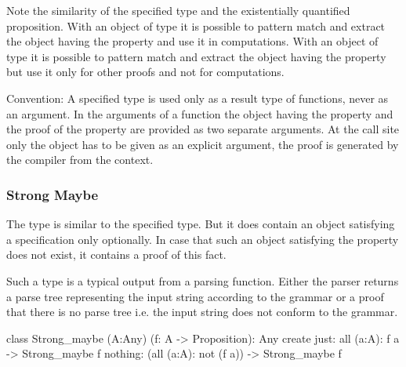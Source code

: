 Note the similarity of the specified type and the existentially quantified
proposition. With an object of type  it is possible
to pattern match and extract the object having the property and use it in
computations. With an object of type  it is possible to
pattern match and extract the object having the property but use it only for
other proofs and not for computations.

Convention: A specified type is used only as a result type of functions, never
as an argument. In the arguments of a function the object having the property
and the proof of the property are provided as two separate arguments. At the
call site only the object has to be given as an explicit argument, the proof
is generated by the compiler from the context.
\newline





\subsubsection{Strong Maybe}

The type  is similar to the specified type. But it does
contain an object satisfying a specification only optionally. In case that
such an object satisfying the property does not exist, it contains a proof of
this fact.

Such a type is a typical output from a parsing function. Either the parser
returns a parse tree representing the input string according to the grammar or
a proof that there is no parse tree i.e. the input string does not conform to
the grammar.

\begin{alba}
   class
     Strong_maybe (A:Any) (f: A -> Proposition): Any
   create
     just:    all (a:A): f a -> Strong_maybe f
     nothing: (all (a:A): not (f a)) -> Strong_maybe f
\end{alba}




